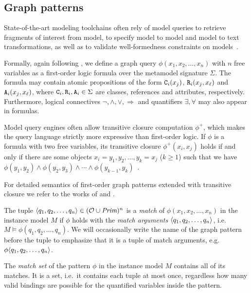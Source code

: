 \subsection{Graph patterns}
\label{ssec:background:patterns}

State-of-the-art modeling toolchains often rely of model queries to retrieve fragments of interest from model, to specify model to model and model to text transformations, as well as to validate well-formedness constraints on models~\citep{Bergmann11validation,Ujhelyi15incquery}.

Formally, again following \citet{Varro17generation}, we define a graph query \(\phi(x_1, x_2, \ldots, x_n)\) with \(n\) free variables as a first-order logic formula over the metamodel signature \(\Sigma\). The formula may contain atomic propositions of the form \(\texttt{\upshape C}_i(x_j)\), \(\texttt{\upshape R}_i(x_j, x_\ell)\) and \(\texttt{\upshape A}_i(x_j, x_\ell)\), where \(\texttt{\upshape C}_i, \texttt{\upshape R}_i, \texttt{\upshape A}_i \in \Sigma\) are classes, references and attributes, respectively. Furthermore, logical connectives \(\neg, \land, \lor, \Rightarrow\) and quantifiers \(\exists, \forall\) may also appear in formulas.

Model query engines often allow transitive closure computation \(\phi^+\), which makes the query language strictly more expressive than first-order logic. If \(\phi\) is a formula with two free variables, its transitive closure \(\phi^+(x_i, x_j)\) holds if and only if there are some objects \(x_i = y_1, y_2, \ldots, y_k = x_j\) (\(k \ge 1\)) such that we have \(\phi(y_1, y_2) \land \phi(y_2, y_3) \land \cdots \land \phi(y_{k - 1}, y_k)\)~\citep{Bergmann12incscc}.

For detailed semantics of first-order graph patterns extended with transitive closure we refer to the works of \citet{Semerath17rewriting} and \citet{Varro17generation}.

The tuple \(\langle q_1, q_2, \ldots, q_n \rangle \in (\mathcal{O} \cup \textit{Prim})^n\) is a \emph{match} of \(\phi(x_1, x_2, \ldots, x_n)\) in the instance model \(M\) if \(\phi\) holds with the \emph{match arguments} \(\langle q_1, q_2, \ldots, q_n \rangle\), i.e.~\(M \vDash \phi(q_1, q_2, \ldots, q_n)\). We will occasionally write the name of the graph pattern before the tuple to emphasize that it is a tuple of match arguments, e.g.~\(\phi\langle q_1, q_2, \ldots, q_n\rangle\).

The \emph{match set} of the pattern \(\phi\) in the instance model \(M\) contains all of its matches. It is a set, i.e.~it contains each tuple at most once, regardless how many valid bindings are possible for the quantified variables inside the pattern.


